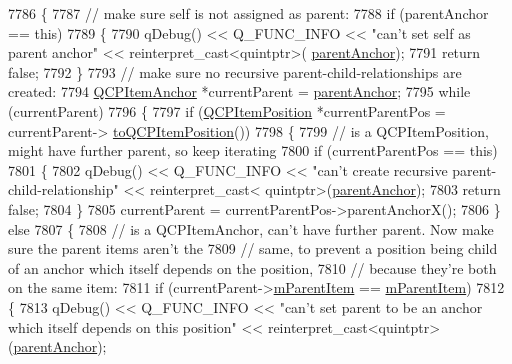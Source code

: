 \begin{DoxyCode}
7786 \{
7787   \textcolor{comment}{// make sure self is not assigned as parent:}
7788   \textcolor{keywordflow}{if} (parentAnchor == \textcolor{keyword}{this})
7789   \{
7790     qDebug() << Q\_FUNC\_INFO << \textcolor{stringliteral}{"can't set self as parent anchor"} << \textcolor{keyword}{reinterpret\_cast<}quintptr\textcolor{keyword}{>}(
      \hyperlink{class_q_c_p_item_position_a7b4ffab9946945c0e11cd2352dc2e042}{parentAnchor});
7791     \textcolor{keywordflow}{return} \textcolor{keyword}{false};
7792   \}
7793   \textcolor{comment}{// make sure no recursive parent-child-relationships are created:}
7794   \hyperlink{class_q_c_p_item_anchor}{QCPItemAnchor} *currentParent = \hyperlink{class_q_c_p_item_position_a7b4ffab9946945c0e11cd2352dc2e042}{parentAnchor};
7795   \textcolor{keywordflow}{while} (currentParent)
7796   \{
7797     \textcolor{keywordflow}{if} (\hyperlink{class_q_c_p_item_position}{QCPItemPosition} *currentParentPos = currentParent->
      \hyperlink{class_q_c_p_item_anchor_ac54b20120669950255a63587193dbb86}{toQCPItemPosition}())
7798     \{
7799       \textcolor{comment}{// is a QCPItemPosition, might have further parent, so keep iterating}
7800       \textcolor{keywordflow}{if} (currentParentPos == \textcolor{keyword}{this})
7801       \{
7802         qDebug() << Q\_FUNC\_INFO << \textcolor{stringliteral}{"can't create recursive parent-child-relationship"} << \textcolor{keyword}{reinterpret\_cast<}
      quintptr\textcolor{keyword}{>}(\hyperlink{class_q_c_p_item_position_a7b4ffab9946945c0e11cd2352dc2e042}{parentAnchor});
7803         \textcolor{keywordflow}{return} \textcolor{keyword}{false};
7804       \}
7805       currentParent = currentParentPos->parentAnchorX();
7806     \} \textcolor{keywordflow}{else}
7807     \{
7808       \textcolor{comment}{// is a QCPItemAnchor, can't have further parent. Now make sure the parent items aren't the}
7809       \textcolor{comment}{// same, to prevent a position being child of an anchor which itself depends on the position,}
7810       \textcolor{comment}{// because they're both on the same item:}
7811       \textcolor{keywordflow}{if} (currentParent->\hyperlink{class_q_c_p_item_anchor_a80fad480ad3bb980446ed6ebc00818ae}{mParentItem} == \hyperlink{class_q_c_p_item_anchor_a80fad480ad3bb980446ed6ebc00818ae}{mParentItem})
7812       \{
7813         qDebug() << Q\_FUNC\_INFO << \textcolor{stringliteral}{"can't set parent to be an anchor which itself depends on this position"}
       << \textcolor{keyword}{reinterpret\_cast<}quintptr\textcolor{keyword}{>}(\hyperlink{class_q_c_p_item_position_a7b4ffab9946945c0e11cd2352dc2e042}{parentAnchor});

\end{DoxyCode}
